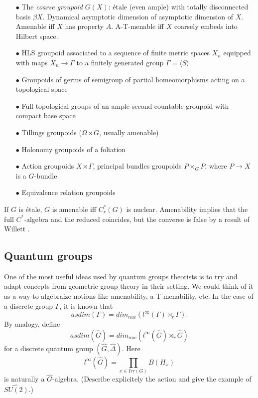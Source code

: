 \begin{itemize}
\item[$\bullet$] The \textit{coarse groupoid} $G(X)$: \'etale (even ample) with totally disconnected basis $\beta X$. Dynamical asymptotic dimension of asymptotic dimension of $X$. Amenable iff $X$ has property $A$. A-T-menable iff $X$ coarsely embeds into Hilbert space. 
\item[$\bullet$] HLS groupoid associated to a sequence of finite metric spaces $X_n$ equipped with maps $X_n \rightarrow \Gamma$ to a finitely generated group $\Gamma = \langle S \rangle$. 
\item[$\bullet$] Groupoids of germs of semigroup of partial homeomorphisms acting on a topological space
\item[$\bullet$] Full topological groups of an ample second-countable groupoid with compact base space
\item[$\bullet$] Tillings groupoids ($\Omega\rtimes G$, usually amenable)
\item[$\bullet$] Holonomy groupoids of a foliation
\item[$\bullet$] Action groupoids $X\rtimes \Gamma$, principal bundles groupoids $P\times_G P$, where $P \rightarrow X$ is a $G$-bundle
\item[$\bullet$] Equivalence relation groupoids
\end{itemize}

If $G$ is \'etale, $G$ is amenable iff $C^*_r(G)$ is nuclear. Amenability implies that the full $C^*$-algebra and the reduced coincides, but the converse is false by a result of Willett \cite{Willett2015non}.

\subsection{Quantum groups}

One of the most useful ideas used by quantum groups theorists is to try and adapt concepts from geometric group theory in their setting. We could think of it as a way to algebraize notions like amenability, a-T-menability, etc. In the case of a discrete group $\Gamma$, it is known \cite{GWY} that
\[asdim(\Gamma) = dim_{nuc} (l^\infty (\Gamma) \rtimes_r \Gamma).\] 
By analogy, define \[asdim(\hat G) = dim_{nuc} (l^\infty (\hat G) \rtimes_r \hat G)\]
for a discrete quantum group $(\hat G, \hat \Delta)$. Here
\[l^\infty(\hat G) = \prod_{x\in Irr(G)} B(H_x)\]
is naturally a $\hat G$-algebra. (Describe explicitely the action and give the example of $\hat{SU(2)}$.)\\

